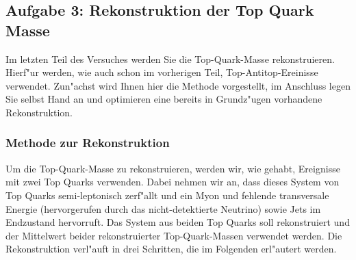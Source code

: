 \subsection{Aufgabe 3: Rekonstruktion der Top Quark Masse}
\label{topreco}

Im letzten Teil des Versuches werden Sie die Top-Quark-Masse rekonstruieren. Hierf"ur werden, wie auch schon im vorherigen Teil, Top-Antitop-Ereinisse verwendet. Zun"achst wird Ihnen hier die Methode vorgestellt, im Anschluss legen Sie selbst Hand an und optimieren eine bereits in Grundz"ugen vorhandene Rekonstruktion.

\subsubsection{Methode zur Rekonstruktion}
\label{subsec:topreco_intro}

Um die Top-Quark-Masse zu rekonstruieren, werden wir, wie gehabt, Ereignisse mit zwei Top Quarks verwenden. Dabei nehmen wir an, dass dieses System von Top Quarks semi-leptonisch zerf"allt und ein Myon und fehlende transversale Energie (hervorgerufen durch das nicht-detektierte Neutrino) sowie Jets im Endzustand hervorruft. Das System aus beiden Top Quarks soll rekonstruiert und der Mittelwert beider rekonstruierter Top-Quark-Massen verwendet werden. Die Rekonstruktion verl"auft in drei Schritten, die im Folgenden erl"autert werden.

